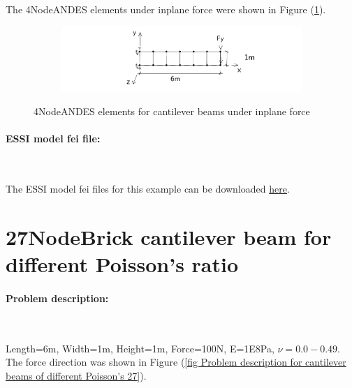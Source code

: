 \documentclass[fleqn,11pt]{article}
\begin{document}
The 4NodeANDES elements under inplane force were shown in Figure (\ref{fig 4NodeANDES elements for cantilever beams under inplane force}).

\begin{figure}[H]
  \centering
  \vskip 8pt
  \begin{subfigure}{0.5\textwidth}
    \centering
    \includegraphics[width=10cm]{../Figure-files/beam_ANDES_yz_inPlane_6div.pdf}
  \end{subfigure}
  \captionsetup{justification=centering,margin=3cm}
  \caption{4NodeANDES elements for cantilever beams under inplane force}
  \label{fig 4NodeANDES elements for cantilever beams under inplane force}
\end{figure}


\paragraph{ESSI model fei file: } ~




The ESSI model fei files for this example can be downloaded \href{https://github.com/yuan-energy/Real-ESSI-Examples/blob/master/model_fei_file/ANDESshell_cantilever_inplane/ANDESshell_cantilever_inplane.tgz?raw=true}{here}.








\newpage
\section{27NodeBrick cantilever beam for different Poisson's ratio}

\paragraph{Problem description: } ~

Length=6m, Width=1m, Height=1m, Force=100N, E=1E8Pa, $\nu=0.0-0.49$.
The force direction was shown in Figure (\ref{fig Problem description for cantilever beams of different Poisson's 27}). 
\end{document}
